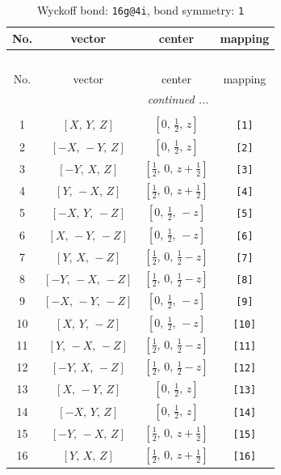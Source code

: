 \documentclass[fleqn,8pt]{jsarticle}
\begin{document}
\begin{longtable}{cccc}
\caption{Wyckoff bond: {\tt 16g@4i}, bond symmetry: {\tt 1}}
 \\
 \hline \hline
No. & vector & center & mapping \\ \hline \endfirsthead

\multicolumn{3}{l}{\tablename\ \thetable{}} \\
 \hline \hline
No. & vector & center & mapping \\ \hline \endhead

 \hline \hline
\multicolumn{3}{r}{\footnotesize\it continued ...} \\ \endfoot

 \hline \hline
\multicolumn{3}{r}{} \\ \endlastfoot

1 & $\left[ X,\, Y,\, Z \right]$ & $\left[ 0,\, \frac{1}{2},\, z \right]$ & {\tt [1]} \\ \hline
2 & $\left[ - X,\, - Y,\, Z \right]$ & $\left[ 0,\, \frac{1}{2},\, z \right]$ & {\tt [2]} \\ \hline
3 & $\left[ - Y,\, X,\, Z \right]$ & $\left[ \frac{1}{2},\, 0,\, z + \frac{1}{2} \right]$ & {\tt [3]} \\ \hline
4 & $\left[ Y,\, - X,\, Z \right]$ & $\left[ \frac{1}{2},\, 0,\, z + \frac{1}{2} \right]$ & {\tt [4]} \\ \hline
5 & $\left[ - X,\, Y,\, - Z \right]$ & $\left[ 0,\, \frac{1}{2},\, - z \right]$ & {\tt [5]} \\ \hline
6 & $\left[ X,\, - Y,\, - Z \right]$ & $\left[ 0,\, \frac{1}{2},\, - z \right]$ & {\tt [6]} \\ \hline
7 & $\left[ Y,\, X,\, - Z \right]$ & $\left[ \frac{1}{2},\, 0,\, \frac{1}{2} - z \right]$ & {\tt [7]} \\ \hline
8 & $\left[ - Y,\, - X,\, - Z \right]$ & $\left[ \frac{1}{2},\, 0,\, \frac{1}{2} - z \right]$ & {\tt [8]} \\ \hline
9 & $\left[ - X,\, - Y,\, - Z \right]$ & $\left[ 0,\, \frac{1}{2},\, - z \right]$ & {\tt [9]} \\ \hline
10 & $\left[ X,\, Y,\, - Z \right]$ & $\left[ 0,\, \frac{1}{2},\, - z \right]$ & {\tt [10]} \\ \hline
11 & $\left[ Y,\, - X,\, - Z \right]$ & $\left[ \frac{1}{2},\, 0,\, \frac{1}{2} - z \right]$ & {\tt [11]} \\ \hline
12 & $\left[ - Y,\, X,\, - Z \right]$ & $\left[ \frac{1}{2},\, 0,\, \frac{1}{2} - z \right]$ & {\tt [12]} \\ \hline
13 & $\left[ X,\, - Y,\, Z \right]$ & $\left[ 0,\, \frac{1}{2},\, z \right]$ & {\tt [13]} \\ \hline
14 & $\left[ - X,\, Y,\, Z \right]$ & $\left[ 0,\, \frac{1}{2},\, z \right]$ & {\tt [14]} \\ \hline
15 & $\left[ - Y,\, - X,\, Z \right]$ & $\left[ \frac{1}{2},\, 0,\, z + \frac{1}{2} \right]$ & {\tt [15]} \\ \hline
16 & $\left[ Y,\, X,\, Z \right]$ & $\left[ \frac{1}{2},\, 0,\, z + \frac{1}{2} \right]$ & {\tt [16]} \\
\end{longtable}
\end{document}
